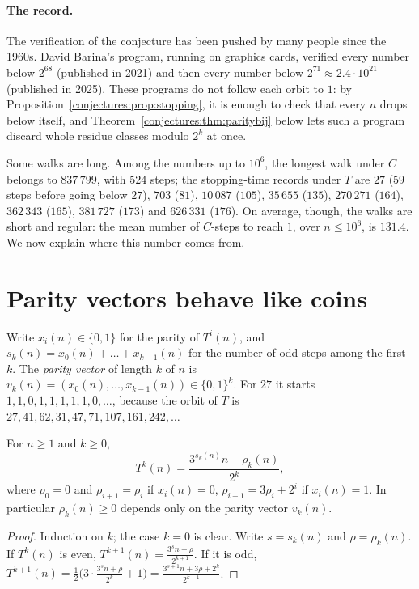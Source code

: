 \paragraph{The record.} The verification of the conjecture has been pushed by many people since the 1960s. David Barina's program, running on graphics cards, verified every number below $2^{68}$ (published in
2021) and then every number below $2^{71}\approx2.4\cdot10^{21}$ (published in 2025). These programs do not follow each orbit to $1$: by
Proposition~\ref{conjectures:prop:stopping}, it is enough to check that every $n$ drops below itself, and Theorem~\ref{conjectures:thm:paritybij} below lets such a
program discard whole residue classes modulo $2^k$ at once.

Some walks are long. Among the numbers up to $10^6$, the longest walk under $C$ belongs to $837\,799$, with $524$ steps; the stopping-time records under
$T$ are $27$ ($59$ steps before going below $27$), $703$ ($81$), $10\,087$ ($105$), $35\,655$ ($135$), $270\,271$ ($164$), $362\,343$ ($165$), $381\,727$
($173$) and $626\,331$ ($176$). On average, though, the walks are short and regular: the mean number of $C$-steps to reach $1$, over $n\le10^6$, is
$131.4$. We now explain where this number comes from.

\section{Parity vectors behave like coins}

Write $x_i(n)\in\{0,1\}$ for the parity of $T^i(n)$, and $s_k(n)=x_0(n)+\dots+x_{k-1}(n)$ for the number of odd steps among the first $k$. The
\emph{parity vector} of length $k$ of $n$ is $v_k(n)=(x_0(n),\dots,x_{k-1}(n))\in\{0,1\}^k$. For $27$ it starts $1,1,0,1,1,1,1,1,0,\dots$, because the orbit of $T$ is $27,41,62,31,47,71,107,161,242,\dots$

\begin{lemma}\label{conjectures:lem:affine}
For $n\ge1$ and $k\ge0$,
\[
T^k(n)=\frac{3^{s_k(n)}n+\rho_k(n)}{2^k},
\]
where $\rho_0=0$ and $\rho_{i+1}=\rho_i$ if $x_i(n)=0$, $\rho_{i+1}=3\rho_i+2^i$ if $x_i(n)=1$. In particular $\rho_k(n)\ge0$ depends only on the parity
vector $v_k(n)$.
\end{lemma}
\begin{proof}
Induction on $k$; the case $k=0$ is clear. Write $s=s_k(n)$ and $\rho=\rho_k(n)$. If $T^k(n)$ is even, $T^{k+1}(n)=\frac{3^sn+\rho}{2^{k+1}}$. If it is odd,
$T^{k+1}(n)=\frac12\bigl(3\cdot\frac{3^sn+\rho}{2^k}+1\bigr)=\frac{3^{s+1}n+3\rho+2^k}{2^{k+1}}$.
\end{proof}

